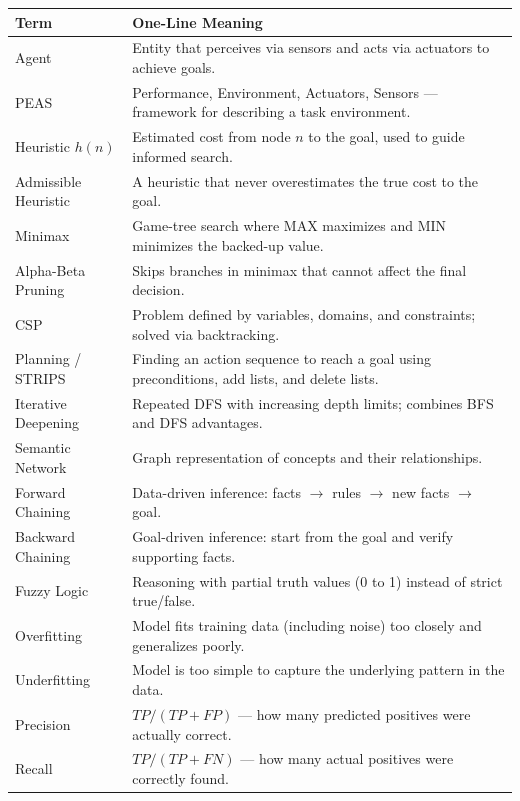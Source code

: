\documentclass[11pt,a4paper]{article}
\begin{document}
\begin{longtable}{@{}p{3.3cm}p{10.2cm}@{}}
\toprule
\rowcolor{primary!15}
\textbf{Term} & \textbf{One-Line Meaning} \\
\midrule
\endhead
Agent & Entity that perceives via sensors and acts via actuators to achieve goals. \\
\addlinespace
PEAS & Performance, Environment, Actuators, Sensors --- framework for describing a task environment. \\
\addlinespace
Heuristic $h(n)$ & Estimated cost from node $n$ to the goal, used to guide informed search. \\
\addlinespace
Admissible Heuristic & A heuristic that never overestimates the true cost to the goal. \\
\addlinespace
Minimax & Game-tree search where MAX maximizes and MIN minimizes the backed-up value. \\
\addlinespace
Alpha-Beta Pruning & Skips branches in minimax that cannot affect the final decision. \\
\addlinespace
CSP & Problem defined by variables, domains, and constraints; solved via backtracking. \\
\addlinespace
Planning / STRIPS & Finding an action sequence to reach a goal using preconditions, add lists, and delete lists. \\
\addlinespace
Iterative Deepening & Repeated DFS with increasing depth limits; combines BFS and DFS advantages. \\
\addlinespace
Semantic Network & Graph representation of concepts and their relationships. \\
\addlinespace
Forward Chaining & Data-driven inference: facts $\to$ rules $\to$ new facts $\to$ goal. \\
\addlinespace
Backward Chaining & Goal-driven inference: start from the goal and verify supporting facts. \\
\addlinespace
Fuzzy Logic & Reasoning with partial truth values (0 to 1) instead of strict true/false. \\
\addlinespace
Overfitting & Model fits training data (including noise) too closely and generalizes poorly. \\
\addlinespace
Underfitting & Model is too simple to capture the underlying pattern in the data. \\
\addlinespace
Precision & $TP/(TP+FP)$ --- how many predicted positives were actually correct. \\
\addlinespace
Recall & $TP/(TP+FN)$ --- how many actual positives were correctly found. \\

\end{longtable}
\end{document}
